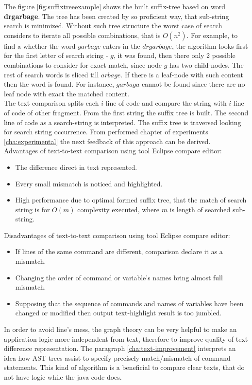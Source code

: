 \documentclass{report}
\begin{document}
The figure \ref{fig:suffixtreeexample} shows the built suffix-tree based on word \textbf{drgarbage}. The tree has been created by so proficient way, that sub-string search is minimized. Without such tree structure the worst case of search considers to iterate all possible combinations, that is $O(n^2)$. For example, to find a whether the word $garbage$ enters in the $drgarbage$, the algorithm looks first for the first letter of search string - $g$, it was found, then there only 2 possible combinations to consider for exact match, since node $g$ has two child-nodes. The rest of search words is sliced till $arbage$. If there is a leaf-node with such content then the word is found. For instance, $garbaga$ cannot be found since there are no leaf node with exact the matched content.
\\
The text comparison splits each $i$ line of code and compare the string with $i$ line of code of other fragment. From the first string the suffix tree is built. The second line of code as a search-string is interpreted. The suffix tree is traversed looking for search string occurrence. From performed chapter of experiments \ref{cha:experimental} the next feedback of this approach can be derived. \\
Advantages of text-to-text comparison using tool Eclipse compare editor:
\begin{itemize}
	\item The difference direct in text represented.
	\item Every small mismatch is noticed and highlighted.
	\item High performance due to optimal formed suffix tree, that the match of search string is for $O(m)$ complexity executed, where $m$ is length of searched sub-string.
\end{itemize}
Disadvantages of text-to-text comparison using tool Eclipse compare editor:
\begin{itemize}
	\item If lines of the same command are different, comparison declare it as a mismatch.
	\item Changing the order of command or variable's names bring almost full mismatch.
	\item Supposing that the sequence of commands and names of variables have been changed or modified then output text-highlight result is too jumbled.
\end{itemize}

In order to avoid line's mess, the graph theory can be very helpful to make an application logic more independent from text, therefore to improve quality of text difference representation. The paragraph \ref{cha:text-improvement} interprets an idea how AST trees assist to specify precisely match/mismatch of command statements. This kind of algorithm is a beneficial to compare clear texts, that do not have logic while the java code does.
\end{document}
